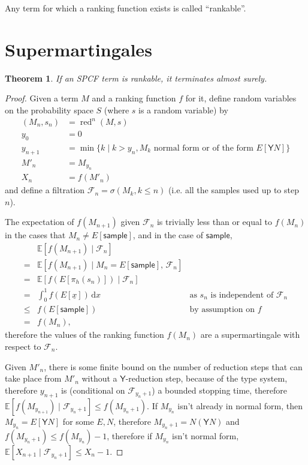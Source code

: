 \documentclass{article}
\newcommand{\tY}{\textsf{Y}}
\newcommand{\tsample}{\textsf{sample}}
\DeclareMathOperator{\red}{red}
\newtheorem{theorem}{Theorem}
\begin{document}
Any term for which a ranking function exists is called ``rankable''.

\section{Supermartingales}

\begin{theorem} \label{rankable implies ast}
  If an SPCF term is rankable, it terminates almost surely.
\end{theorem}
\begin{proof}
Given a term $M$ and a ranking function $f$ for it, define random variables on the probability space $S$ (where $s$ is a random variable) by
\begin{align*}
(M_n,s_n) & = \red^n(M,s) \\
y_0 & = 0 \\
y_{n+1} & = \min \{ k \mid k>y_n, M_k \text{ normal form or of the form } E[\tY N] \}\\
M'_n & = M_{y_n} \\
X_n & = f(M'_n)
\end{align*}
and define a filtration $\mathcal{F}_n = \sigma(M_k, k \leq n)$ (i.e. all the samples used up to step $n$).

The expectation of $f(M_{n+1})$ given $\mathcal{F}_n$ is trivially less than or equal to $f(M_n)$ in the cases that $M_n \neq E[\tsample]$, and in the case of $\tsample$,
\begin{align*}
& \mathbb{E}[f(M_{n+1}) \mid \mathcal{F}_n] \\
= & \mathbb{E}[f(M_{n+1}) \mid M_n = E[\tsample],\, \mathcal{F}_n] \\
= & \mathbb{E}[f(E[\pi_h(s_n)]) \mid \mathcal{F}_n] \\
= & \int_0^1 f(E[\underline x]) \, \mathrm{d} x \qquad & \text{as }s_n\text{ is independent of } \mathcal{F}_n \\
\leq & f(E[\tsample]) \qquad & \text{by assumption on } f \\
= & f(M_n),
\end{align*}
therefore the values of the ranking function $f(M_n)$ are a supermartingale with respect to $\mathcal{F}_n$.

Given $M'_n$, there is some finite bound on the number of reduction steps that can take place from $M'_n$ without a $\tY$-reduction step, because of the type system, therefore $y_{n+1}$ is (conditional on $\mathcal{F}_{y_n+1}$) a bounded stopping time, therefore $\mathbb{E}[f(M_{y_{n+1}}) \mid \mathcal{F}_{y_n+1}] \leq f(M_{y_n+1})$. If $M_{y_n}$ isn't already in normal form, then $M_{y_n} = E[\tY N]$ for some $E, N$, therefore $M_{y_n+1} = N (\tY N)$ and $f(M_{y_n+1}) \leq f(M_{y_n}) - 1$, therefore if $M_{y_n}$ isn't normal form, $\mathbb{E}[X_{n+1} \mid \mathcal{F}_{y_n+1}] \leq X_n - 1$.


\end{proof}
\end{document}

